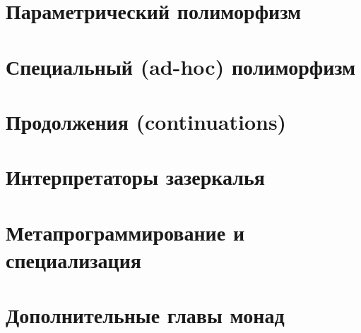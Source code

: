 \documentclass[12pt]{article}
\begin{document}
    

    \clearpage


    \section{Параметрический полиморфизм}

    

    \clearpage


    \section{Специальный (ad-hoc) полиморфизм} \label{sec:ad-hoc}

    

    \clearpage


    \section{Продолжения (continuations)} \label{sec:continuations}

    

    \clearpage


    \section{Интерпретаторы зазеркалья} \label{sec:wonder-interpreters}

    

    \clearpage


    \section{Метапрограммирование и специализация}

    

    \clearpage


    \section{Дополнительные главы монад} \label{sec:monads}




\end{document}
